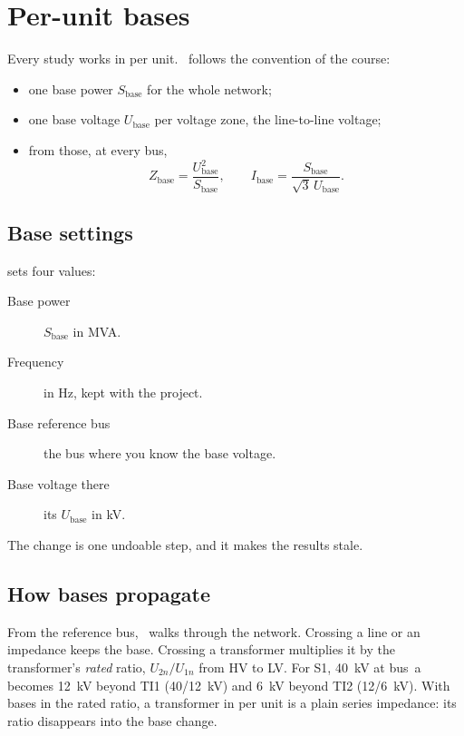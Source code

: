 \chapter{Per-unit bases}\label{ch:bases}

Every study works in per unit. \app\ follows the convention of the course:

\begin{itemize}
  \item one base power $S_\text{base}$ for the whole network;
  \item one base voltage $U_\text{base}$ per voltage zone, the line-to-line voltage;
  \item from those, at every bus,
    \[
      Z_\text{base} = \frac{U_\text{base}^2}{S_\text{base}}, \qquad
      I_\text{base} = \frac{S_\text{base}}{\sqrt3\,U_\text{base}} .
    \]
\end{itemize}

\section{Base settings}

\begin{minipage}[t]{0.5\linewidth}
 sets four values:

\begin{description}
  \item[Base power] $S_\text{base}$ in MVA.
  \item[Frequency] in Hz, kept with the project.
  \item[Base reference bus] the bus where you know the base voltage.
  \item[Base voltage there] its $U_\text{base}$ in kV.
\end{description}

The change is one undoable step, and it makes the results stale.
\end{minipage}\hfill
\begin{minipage}[t]{0.45\linewidth}\vspace{0pt}
  \centering{}
\end{minipage}

\section{How bases propagate}

From the reference bus, \app\ walks through the network. Crossing a line or an impedance
keeps the base. Crossing a transformer multiplies it by the transformer's \emph{rated}
ratio, $U_{2n}/U_{1n}$ from HV to LV. For S1, 40~kV at bus~a becomes 12~kV beyond TI1
(40/12~kV) and 6~kV beyond TI2 (12/6~kV). With bases in the rated ratio, a transformer in
per unit is a plain series impedance: its ratio disappears into the base change.

